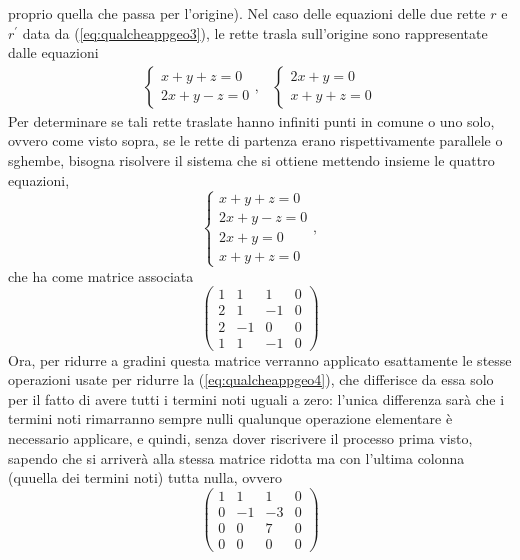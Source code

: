 proprio quella che passa per l'origine).
Nel caso delle equazioni delle due rette $r$ e $r^\prime$ data da (\ref{eq:qualcheappgeo3}), le rette
trasla sull'origine sono rappresentate dalle equazioni
\begin{eqnarray}
  \label{eq:eq:qualcheappgeo5}
  \begin{cases}
    x+y+z=0\\
    2x+y-z=0
  \end{cases}, &
                 \begin{cases}
                   2x+y=0\\
                   x+y+z=0
                 \end{cases}
\end{eqnarray}
Per determinare se tali rette traslate hanno infiniti punti in comune o uno solo, ovvero come visto
sopra, se le rette di partenza erano rispettivamente parallele o sghembe, bisogna risolvere il sistema
che si ottiene mettendo insieme le quattro equazioni,
\begin{equation*}
  \begin{cases}
    x+y+z=0\\
    2x+y-z=0\\
    2x+y=0\\
    x+y+z=0
  \end{cases},
\end{equation*}
che ha come matrice associata
\begin{equation*}
  \left(
    \begin{array}{ccc|c}
      1 &  1 &  1 & 0\\
      2 &  1 & -1 & 0\\
      2 & -1 &  0 & 0\\
      1 &  1 & -1 & 0
    \end{array}
  \right)
\end{equation*}
Ora, per ridurre a gradini questa matrice verranno applicato esattamente le stesse operazioni usate
per ridurre la (\ref{eq:qualcheappgeo4}), che differisce da essa solo per il fatto di avere tutti i
termini noti uguali a zero: l'unica differenza sarà che i termini noti rimarranno sempre nulli qualunque
operazione elementare è necessario applicare, e quindi, senza dover riscrivere il processo prima visto,
sapendo che si arriverà alla stessa matrice ridotta ma con l'ultima colonna (quuella dei termini noti)
tutta nulla, ovvero
\begin{equation*}
  \left(
    \begin{array}{ccc|c}
      1 &  1 &  1 & 0\\
      0 & -1 & -3 & 0\\
      0 &  0 &  7 & 0\\
      0 &  0 &  0 & 0
    \end{array}
  \right)
\end{equation*}
